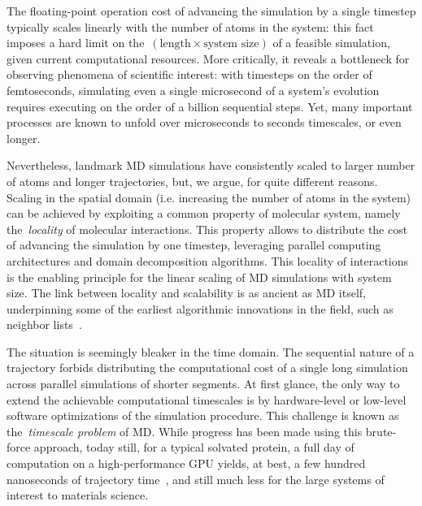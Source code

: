 The floating-point operation cost of advancing the simulation by a single timestep typically scales linearly with the number of atoms in the system: this fact imposes a hard limit on the~$(\text{length}\times\text{system size})$ of a feasible simulation, given current computational resources.
More critically, it reveals a bottleneck for observing phenomena of scientific interest: with timesteps on the order of femtoseconds, simulating even a single microsecond of a system's evolution requires executing on the order of a billion sequential steps. Yet, many important processes are known to unfold over microseconds to seconds timescales, or even longer.

Nevertheless, landmark MD simulations have consistently scaled to larger number of atoms and longer trajectories, but, we argue, for quite different reasons. 
Scaling in the spatial domain (i.e. increasing the number of atoms in the system) can be achieved by exploiting a common property of molecular system, namely the~\textit{locality} of molecular interactions. This property allows to distribute the cost of advancing the simulation by one timestep, leveraging parallel computing architectures and domain decomposition algorithms.
This locality of interactions is the enabling principle for the linear scaling of MD simulations with system size. The link between locality and scalability is as ancient as MD itself, underpinning some of the earliest algorithmic innovations in the field, such as neighbor lists~\cite{V67}.

The situation is seemingly bleaker in the time domain. The sequential nature of a trajectory forbids distributing the computational cost of a single long simulation across parallel simulations of shorter segments. At first glance, the only way to extend the achievable computational timescales is by hardware-level or low-level software optimizations of the simulation procedure.
This challenge is known as the~\textit{timescale problem} of MD. While progress has been made using this brute-force approach, today still, for a typical solvated protein, a full day of computation on a high-performance GPU yields, at best, a few hundred nanoseconds of trajectory time~\cite{HD18}, and still much less for the large systems of interest to materials science.


